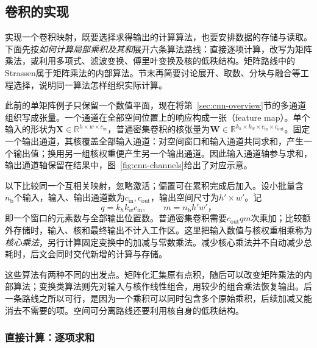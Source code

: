 \subsection{卷积的实现}
\label{sec:cnn-implementation}

实现一个卷积映射，既要选择求得输出的计算算法，也要安排数据的存储与读取。下面先按\emph{如何计算局部乘积及其和}展开六条算法路线：直接逐项计算，改写为矩阵乘法，或利用多项式、滤波变换、傅里叶变换及核的低秩结构。矩阵路线中的Strassen属于矩阵乘法的内部算法。节末再简要讨论展开、取数、分块与融合等工程选择，说明同一算法怎样组织实际计算。

此前的单矩阵例子只保留一个数值平面，现在将第~\ref{sec:cnn-overview}节的多通道组织写成张量。一个通道在全部空间位置上的响应构成一张（feature map）。单个输入的形状为$\bm X\in\mathbb R^{h\times w\times c_{\mathrm{in}}}$，普通密集卷积的核张量为$\bm W\in\mathbb R^{k_h\times k_w\times c_{\mathrm{in}}\times c_{\mathrm{out}}}$。固定一个输出通道，其核覆盖全部输入通道：对空间窗口和输入通道共同求和，产生一个输出值；换用另一组核权重便产生另一个输出通道。因此输入通道轴参与求和，输出通道轴保留在结果中，图~\ref{fig:cnn-channels}给出了对应示意。

以下比较同一个互相关映射，忽略激活；偏置可在累积完成后加入。设小批量含$n_{\mathrm b}$个输入，输入、输出通道数为$c_{\mathrm{in}},c_{\mathrm{out}}$，输出空间尺寸为$h'\times w'$。记
\[
  q=k_hk_wc_{\mathrm{in}},\qquad m=n_{\mathrm b}h'w'\text{，}
\]
即一个窗口的元素数与全部输出位置数。普通密集卷积需要$c_{\mathrm{out}}qm$次乘加；比较额外存储时，输入、核和最终输出不计入工作区。这里把输入数值与核权重相乘称为\emph{核心乘法}，另行计算固定变换中的加减与常数乘法。减少核心乘法并不自动减少总耗时，后文会同时交代新增的计算与存储。

这些算法有两种不同的出发点。矩阵化汇集原有点积，随后可以改变矩阵乘法的内部算法；变换类算法则先对输入与核作线性组合，用较少的组合乘法恢复输出。后一条路线之所以可行，是因为一个乘积可以同时包含多个原始乘积，后续加减又能消去不需要的项。空间可分离路线还要利用核自身的低秩结构。

\subsubsection{直接计算：逐项求和}
\label{sec:cnn-direct-implementation}

